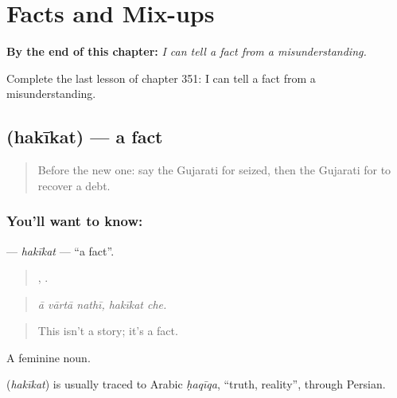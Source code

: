 
\chapter{Facts and Mix-ups}
\label{ch:gu-facts-and-mix-ups}

\begin{chapteropening}
\textbf{By the end of this chapter:} \emph{I can tell a fact from a misunderstanding.}

Complete the last lesson of chapter 351: I can tell a fact from a misunderstanding.
\end{chapteropening}

\section[\texorpdfstring{\gu{હકીકત} (hakīkat)}{હકીકત (hakīkat)}]{ (hakīkat) — a fact}

\label{lesson:GU-C351-hakikat}



\begin{quote}
Before the new one: say the Gujarati for seized, then the Gujarati for to recover a debt.
\end{quote}

\subsection*{You'll want to know: }
\textbf{} — \emph{hakīkat} — \textquotedblleft{}a fact\textquotedblright{}.

\begin{quote}
  ,  .
\end{quote}

\begin{quote}
\emph{ā vārtā nathī, hakīkat che.}
\end{quote}

\begin{quote}
This isn't a story; it's a fact.
\end{quote}

A feminine noun.

\begin{cousinweb}
\textbf{} (\emph{hakīkat}) is usually traced to Arabic \emph{ḥaqīqa}, \textquotedblleft{}truth, reality\textquotedblright{}, through Persian.
\end{cousinweb}

